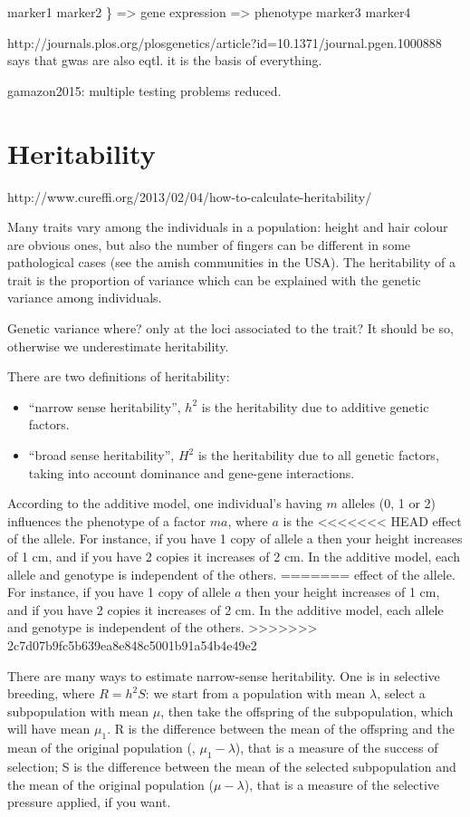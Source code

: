\documentclass[../main.tex]{subfiles}
\begin{document}
marker1
marker2
			\} => gene expression => phenotype
marker3
marker4

http://journals.plos.org/plosgenetics/article?id=10.1371/journal.pgen.1000888 
says that gwas are also eqtl. it is the basis of everything.

gamazon2015: multiple testing problems reduced.

\section{Heritability}

http://www.cureffi.org/2013/02/04/how-to-calculate-heritability/

Many traits vary among the individuals in a population: height and hair 
colour are obvious ones, but also the number of fingers can be different 
in some pathological cases (see the amish communities in the USA). The 
heritability of a trait is the proportion of variance which can be 
explained with the genetic variance among individuals.

Genetic variance where? only at the loci associated to the trait? It 
should be so, otherwise we underestimate heritability.

There are two definitions of heritability:

\begin{itemize}
	\item \enquote{narrow sense heritability}, $h^2$ is the heritability 
		due to additive genetic factors.
	\item \enquote{broad sense heritability}, $H^2$ is the heritability 
		due to all genetic factors, taking into account dominance and 
		gene-gene interactions.
\end{itemize}

According to the additive model, one individual's having $m$ alleles (0, 
1 or 2) influences the phenotype of a factor $m a$, where $a$ is the 
<<<<<<< HEAD
  effect of the allele. For instance, if you have 1 copy of allele a 
then your height increases of 1 cm, and if you have 2 copies it 
increases of 2 cm. In the additive model, each allele and genotype is 
independent of the others.
=======
  effect of the allele. For instance, if you have 1 copy of allele $a$ 
  then your height increases of 1 cm, and if you have 2 copies it 
  increases of 2 cm. In the additive model, each allele and genotype is 
  independent of the others.
>>>>>>> 2c7d07b9fc5b639ea8e848c5001b91a54b4e49e2

There are many ways to estimate narrow-sense heritability. One is in 
selective breeding, where $R = h^2 S$: we start from a population with 
mean $\lambda$, select a subpopulation with mean $\mu$, then take the 
offspring of the subpopulation, which will have mean $\mu_1$. R is the 
difference between the mean of the offspring and the mean of the 
original population (\ie, $\mu_1 - \lambda$), that is a measure of the 
success of selection; S is the difference between the mean of the 
selected subpopulation and the mean of the original population (\ie $\mu 
- \lambda$), that is a measure of the selective pressure applied, if you 
want.
\end{document}
